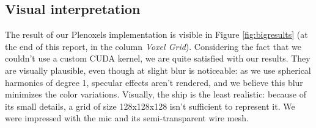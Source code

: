 \documentclass{article}
\begin{document}
\subsection{Visual interpretation}

%

The result of our Plenoxels implementation is visible in Figure \ref{fig:bigresults} (at the end of this report, in the column \textit{Voxel Grid}). Considering the fact that we couldn't use a custom CUDA kernel, we are quite satisfied with our results. They are visually plausible, even though at slight blur is noticeable: as we use spherical harmonics of degree 1, specular effects aren't rendered, and we believe this blur minimizes the color variations. Visually, the ship is the least realistic: because of its small details, a grid of size 128x128x128 isn't sufficient to represent it. We were impressed with the mic and its semi-transparent wire mesh.
\end{document}
